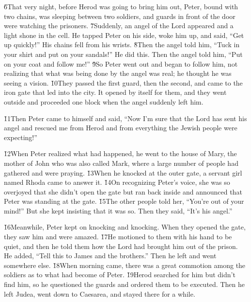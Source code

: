 \v{6}That very night, before Herod was going to bring him out, Peter, bound with two chains, was sleeping between two soldiers, and guards in front of the door were watching the prisoners. \v{7}Suddenly, an angel of the Lord appeared and a light shone in the cell. He tapped Peter on his side, woke him up, and said, ``Get up quickly!'' His chains fell from his wrists. \v{8}Then the angel told him, ``Tuck in your shirt and put on your sandals!'' He did this. Then the angel told him, ``Put on your coat and follow me!'' \v{9}So Peter went out and began to follow him, not realizing that what was being done by the angel was real; he thought he was seeing a vision. \v{10}They passed the first guard, then the second, and came to the iron gate that led into the city. It opened by itself for them, and they went outside and proceeded one block when the angel suddenly left him.

\v{11}Then Peter came to himself and said, ``Now I'm sure that the Lord has sent his angel and rescued me from Herod and from everything the Jewish people were expecting!''

\v{12}When Peter realized what had happened, he went to the house of Mary, the mother of John who was also called Mark, where a large number of people had gathered and were praying. \v{13}When he knocked at the outer gate, a servant girl named Rhoda came to answer it. \v{14}On recognizing Peter's voice, she was so overjoyed that she didn't open the gate but ran back inside and announced that Peter was standing at the gate. \v{15}The other people told her, ``You're out of your mind!'' But she kept insisting that it was so. Then they said, ``It's his angel.''

\v{16}Meanwhile, Peter kept on knocking and knocking. When they opened the gate, they saw him and were amazed. \v{17}He motioned to them with his hand to be quiet, and then he told them how the Lord had brought him out of the prison. He added, ``Tell this to James and the brothers.'' Then he left and went somewhere else. \v{18}When morning came, there was a great commotion among the soldiers as to what had become of Peter. \v{19}Herod searched for him but didn't find him, so he questioned the guards and ordered them to be executed. Then he left Judea, went down to Caesarea, and stayed there for a while.


